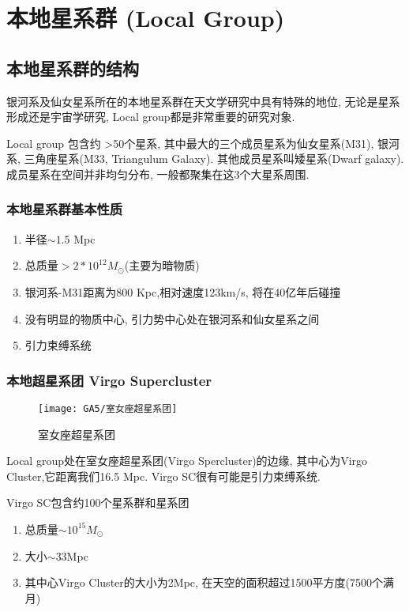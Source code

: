 \newpage
\section{本地星系群 (Local Group)}

\subsection{本地星系群的结构}
银河系及仙女星系所在的本地星系群在天文学研究中具有特殊的地位, 无论是星系形成还是宇宙学研究, Local group都是非常重要的研究对象. 

Local group 包含约 >50个星系, 其中最大的三个成员星系为仙女星系(M31), 银河系, 三角座星系(M33, Triangulum Galaxy). 其他成员星系叫矮星系(Dwarf galaxy). 成员星系在空间并非均匀分布, 一般都聚集在这3个大星系周围. 

\subsubsection{本地星系群基本性质}

\begin{enumerate}\small 
    \item 半径$\sim 1.5$ Mpc
    \item 总质量$>2*10^{12} M_{\odot}$(主要为暗物质)
    \item 银河系-M31距离为800 Kpc,相对速度123km/s, 将在40亿年后碰撞
    \item 没有明显的物质中心, 引力势中心处在银河系和仙女星系之间
    \item 引力束缚系统
\end{enumerate}

\subsubsection{本地超星系团 Virgo Supercluster}

\begin{figure}[!htb]
    \centering
    \texttt{[image: GA5/室女座超星系团]}
    \caption{室女座超星系团}
\end{figure}


Local group处在室女座超星系团(Virgo Spercluster)的边缘, 其中心为Virgo Cluster,它距离我们16.5 Mpc.  Virgo SC很有可能是引力束缚系统. 

Virgo SC包含约100个星系群和星系团
\begin{enumerate}\small
    \item 总质量$\sim 10^{15} M_{\odot}$
    \item 大小$\sim$33Mpc
    \item 其中心Virgo Cluster的大小为2Mpc, 在天空的面积超过1500平方度(7500个满月)
\end{enumerate}

